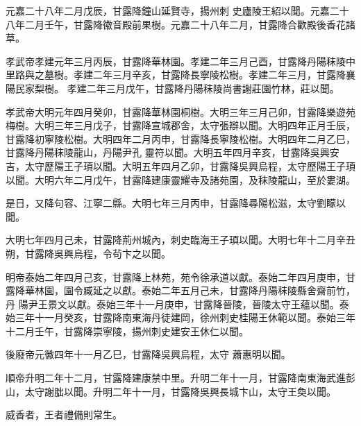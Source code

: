 \begin{pinyinscope}
 元嘉二十八年二月戊辰，甘露降鐘山延賢寺，揚州刺
 史廬陵王紹以聞。元嘉二十八年二月壬午，甘露降徽音殿前果樹。元嘉二十八年二月，甘露降合歡殿後香花諸草。



 孝武帝孝建元年三月丙辰，甘露降華林園。孝建二年三月己酉，甘露降丹陽秣陵中里路與之墓樹。孝建二年三月辛亥，甘露降長寧陵松樹。孝建二年三月，甘露降襄陽民家梨樹。
 孝建二年三月戊午，甘露降丹陽秣陵尚書謝莊園竹林，莊以聞。



 孝武帝大明元年四月癸卯，甘露降華林園桐樹。大明三年三月己卯，甘露降樂遊苑梅樹。大明三年三月戊子，甘露降宣城郡舍，太守張辯以聞。大明四年正月壬辰，甘露降初寧陵松樹。大明四年二月丙申，甘露降長寧陵松樹。大明四年二月乙巳，甘露降丹陽秣陵龍山，丹陽尹孔
 靈符以聞。大明五年四月辛亥，甘露降吳興安吉，太守歷陽王子頊以聞。大明五年四月乙卯，甘露降吳興烏程，太守歷陽王子頊以聞。大明六年二月戊午，甘露降建康靈耀寺及諸苑園，及秣陵龍山，至於婁湖。



 是日，又降句容、江寧二縣。大明七年三月丙申，甘露降尋陽松滋，太守劉矇以聞。



 大明七年四月己未，甘露降荊州城內，刺史臨海王子頊以聞。大明七年十二月辛丑朔，甘露降吳興烏程，令茍卞之以聞。



 明帝泰始二年四月己亥，甘露降上林苑，苑令徐承道以獻。泰始二年四月庚申，甘露降華林園，園令臧延之以獻。泰始二年五月己未，甘露降丹陽秣陵縣舍齋前竹，丹
 陽尹王景文以獻。泰始三年十一月庚申，甘露降晉陵，晉陵太守王蘊以聞。泰始三年十一月癸亥，甘露降南東海丹徒建岡，徐州刺史桂陽王休範以聞。泰始三年十二月壬午，甘露降崇寧陵，揚州刺史建安王休仁以聞。



 後廢帝元徽四年十一月乙巳，甘露降吳興烏程，太守
 蕭惠明以聞。



 順帝升明二年十二月，甘露降建康禁中里。升明二年十一月，甘露降南東海武進彭山，太守謝朏以聞。升明二年十一月，甘露降吳興長城卞山，太守王奐以聞。


威香者，王者禮備則常生。



\end{pinyinscope}